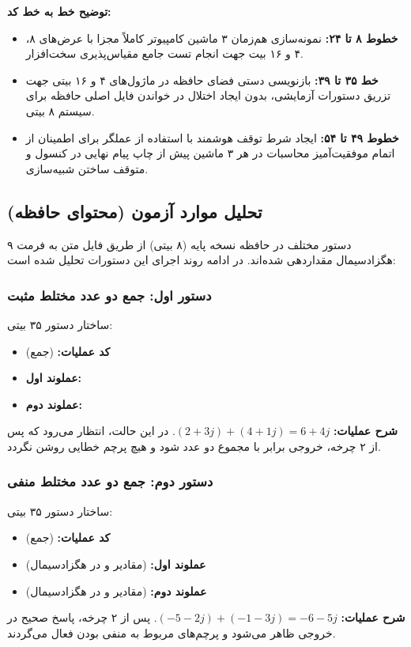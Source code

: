 \documentclass[11pt,a4paper]{article}
\begin{document}
\textbf{توضیح خط به خط کد:}
\begin{itemize}
    \item \textbf{خطوط ۸ تا ۲۴:} نمونه‌سازی هم‌زمان ۳ ماشین کامپیوتر کاملاً مجزا با عرض‌های ۸، ۴ و ۱۶ بیت جهت انجام تست جامع مقیاس‌پذیری سخت‌افزار.
    \item \textbf{خط ۳۵ تا ۳۹:} بازنویسی دستی فضای حافظه در ماژول‌های ۴ و ۱۶ بیتی جهت تزریق دستورات آزمایشی، بدون ایجاد اختلال در خواندن فایل اصلی حافظه برای سیستم ۸ بیتی.
    \item \textbf{خطوط ۴۹ تا ۵۴:} ایجاد شرط توقف هوشمند با استفاده از عملگر  برای اطمینان از اتمام موفقیت‌آمیز محاسبات در هر ۳ ماشین پیش از چاپ پیام نهایی در کنسول و متوقف ساختن شبیه‌سازی.
\end{itemize}

\subsection{تحلیل موارد آزمون (محتوای حافظه)}
۹ دستور مختلف در حافظه نسخه پایه (۸ بیتی) از طریق فایل متن به فرمت هگزادسیمال مقداردهی شده‌اند. در ادامه روند اجرای این دستورات تحلیل شده است:

\subsubsection{دستور اول: جمع دو عدد مختلط مثبت}
ساختار دستور ۳۵ بیتی: 
\begin{itemize}
    \item \textbf{کد عملیات:}  (جمع)
    \item \textbf{عملوند اول:} 
    \item \textbf{عملوند دوم:} 
\end{itemize}
\textbf{شرح عملیات:} $(2+3j) + (4+1j) = 6+4j$. در این حالت، انتظار می‌رود که پس از ۲ چرخه، خروجی برابر با مجموع دو عدد شود و هیچ پرچم خطایی روشن نگردد.

\subsubsection{دستور دوم: جمع دو عدد مختلط منفی}
ساختار دستور ۳۵ بیتی: 
\begin{itemize}
    \item \textbf{کد عملیات:}  (جمع)
    \item \textbf{عملوند اول:}  (مقادیر  و  در هگزادسیمال)
    \item \textbf{عملوند دوم:}  (مقادیر  و  در هگزادسیمال)
\end{itemize}
\textbf{شرح عملیات:} $(-5-2j) + (-1-3j) = -6-5j$. پس از ۲ چرخه، پاسخ صحیح در خروجی ظاهر می‌شود و پرچم‌های مربوط به منفی بودن فعال می‌گردند.
\end{document}
